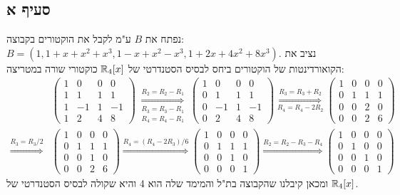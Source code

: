 \documentclass{article}
\begin{document}
	 \subsection*{סעיף א}
	 נפתח את $B$ ע"מ לקבל את הוקטורים בקבוצה: \\
	 $B = (1, 1 + x + x^2 + x^3, 1 - x + x^2 - x^3, 1 + 2x + 4x^2 + 8x^3)$.
	 נציב את הקואורדינטות של הוקטורים ביחס לבסיס הסטנדרטי של $\mathbb{R}_4[x]$ כוקטורי שורה במטריצה:
	 \begin{align*}
		&\begin{pmatrix}
			 1 & 0 & 0 & 0 \\
			 1 & 1 & 1 & 1 \\
			 1 & -1 & 1 & -1 \\
			 1 & 2 & 4 & 8
		 \end{pmatrix} \overset{R_2 = R_2 - R_1}{\underset{\substack{R_3 = R_3 - R_1 \\ R_4 = R_4 - R_1}}\Rightarrow}
		 \begin{pmatrix}
			1 & 0 & 0 & 0 \\
			0 & 1 & 1 & 1 \\
			0 & -1 & 1 & -1 \\
			0 & 2 & 4 & 8
		\end{pmatrix} \overset{R_3 = R_3 + R_2}{\underset{R_4 = R_4 - 2R_2}\Rightarrow}
		\begin{pmatrix}
			1 & 0 & 0 & 0 \\
			0 & 1 & 1 & 1 \\
			0 & 0 & 2 & 0 \\
			0 & 0 & 2 & 6
		\end{pmatrix} \\ \overset{R_3 = R_3 / 2}{\Rightarrow}
		&\begin{pmatrix}
			1 & 0 & 0 & 0 \\
			0 & 1 & 1 & 1 \\
			0 & 0 & 1 & 0 \\
			0 & 0 & 2 & 6
		\end{pmatrix} \overset{R_4 = (R_4 - 2R_3)/6}{\Rightarrow}
		\begin{pmatrix}
			1 & 0 & 0 & 0 \\
			0 & 1 & 1 & 1 \\
			0 & 0 & 1 & 0 \\
			0 & 0 & 0 & 1
		\end{pmatrix} \overset{R_2 = R_2 - R_3 - R_4}{\Rightarrow}
		\begin{pmatrix}
			1 & 0 & 0 & 0 \\
			0 & 1 & 0 & 0 \\
			0 & 0 & 1 & 0 \\
			0 & 0 & 0 & 1
		\end{pmatrix}
	\end{align*}
	ומכאן קיבלנו שהקבוצה בת"ל והמימד שלה הוא 4 והיא שקולה לבסיס הסטנדרטי של $\mathbb{R}_4[x]$.
\end{document}
